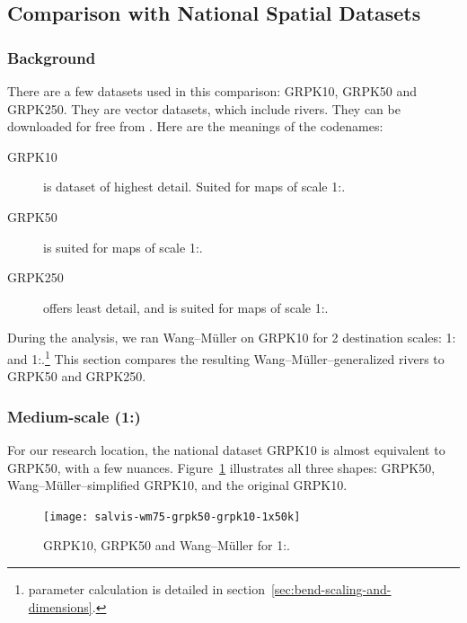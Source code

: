 \documentclass[a4paper]{article}
\newcommand{\WM}{Wang--M{\"u}ller}
\begin{document}
\subsection{Comparison with National Spatial Datasets}

\subsubsection{Background}

There are a few datasets used in this comparison: GRPK10, GRPK50 and
GRPK250. They are vector datasets, which include rivers. They can be
downloaded for free from \cite{nzt}. Here are the meanings of the codenames:

\begin{description}

    \item[GRPK10] is dataset of highest detail. Suited for maps of scale
        1:.

    \item[GRPK50] is suited for maps of scale 1:.

    \item[GRPK250] offers least detail, and is suited for maps of
        scale 1:.

\end{description}

During the analysis, we ran {\WM} on GRPK10 for 2 destination scales:
1: and 1:.\footnote{parameter calculation is
detailed in section~\ref{sec:bend-scaling-and-dimensions}.} This section
compares the resulting {\WM}--generalized rivers to GRPK50 and GRPK250.

\subsubsection{Medium-scale (1:)}

For our research location, the national dataset GRPK10 is almost equivalent to
GRPK50, with a few nuances. Figure~\ref{fig:salvis-wm75-grpk50-grpk10-1x50k}
illustrates all three shapes: GRPK50, {\WM}--simplified GRPK10, and the
original GRPK10.

\begin{figure}[h!]
    \centering
    \texttt{[image: salvis-wm75-grpk50-grpk10-1x50k]}

    \caption{GRPK10, GRPK50 and {\WM} for 1:.}

    \label{fig:salvis-wm75-grpk50-grpk10-1x50k}
\end{figure}
\end{document}
